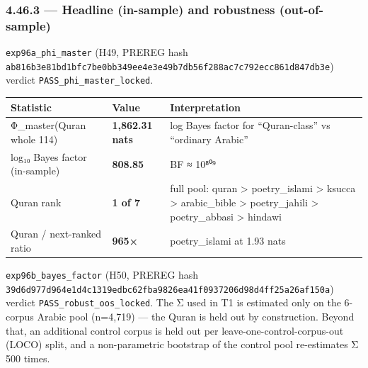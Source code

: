 \documentclass[
]{article}
\newcounter{none} %
\begin{document}
\subsubsection{4.46.3 --- Headline (in-sample) and robustness
(out-of-sample)}\label{headline-in-sample-and-robustness-out-of-sample}

\texttt{exp96a\_phi\_master} (H49, PREREG hash
\texttt{ab816b3e81bd1bfc7be0bb349ee4e3e49b7db56f288ac7c792ecc861d847db3e})
verdict \texttt{PASS\_phi\_master\_locked}.

{\def\LTcaptype{none} %
\begin{longtable}[]{@{}
  >{\raggedright\arraybackslash}p{}
  >{\raggedleft\arraybackslash}p{}
  >{\raggedright\arraybackslash}p{}@{}}
\toprule\noalign{}
\begin{minipage}[b]{\linewidth}\raggedright
Statistic
\end{minipage} & \begin{minipage}[b]{\linewidth}\raggedleft
Value
\end{minipage} & \begin{minipage}[b]{\linewidth}\raggedright
Interpretation
\end{minipage} \\
\midrule\noalign{}
\endhead
\bottomrule\noalign{}
\endlastfoot
Φ\_master(Quran whole 114) & \textbf{1,862.31 nats} & log Bayes factor
for ``Quran-class'' vs ``ordinary Arabic'' \\
log₁₀ Bayes factor (in-sample) & \textbf{808.85} & BF ≈ 10⁸⁰⁹ \\
Quran rank & \textbf{1 of 7} & full pool: quran \textgreater{}
poetry\_islami \textgreater{} ksucca \textgreater{} arabic\_bible
\textgreater{} poetry\_jahili \textgreater{} poetry\_abbasi
\textgreater{} hindawi \\
Quran / next-ranked ratio & \textbf{965×} & poetry\_islami at 1.93
nats \\
\end{longtable}
}

\texttt{exp96b\_bayes\_factor} (H50, PREREG hash
\texttt{39d6d977d964e1d4c1319edbc62fba9826ea41f0937206d98d4ff25a26af150a})
verdict \texttt{PASS\_robust\_oos\_locked}. The Σ used in T1 is
estimated only on the 6-corpus Arabic pool (n=4,719) --- the Quran is
held out by construction. Beyond that, an additional control corpus is
held out per leave-one-control-corpus-out (LOCO) split, and a
non-parametric bootstrap of the control pool re-estimates Σ 500 times.
\end{document}
